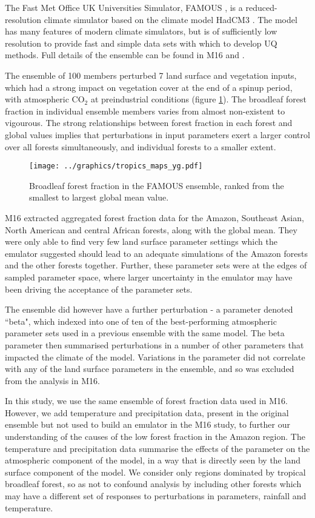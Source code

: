 \documentclass[gmd, manuscript]{copernicus}
\begin{document}
The Fast Met Office UK Universities Simulator, FAMOUS \citep{jones2005systematic, smith2008famous}, is a reduced-resolution climate simulator based on the climate model HadCM3 \citep{gordon2000simulation, pope2000impact}. The model has many features of modern climate simulators, but is of sufficiently low resolution to provide fast and simple data sets with which to develop UQ methods. Full details of the ensemble can be found in M16 and \cite{williams2013optimising}.

The ensemble of 100 members perturbed 7 land surface and vegetation inputs, which had a strong impact on vegetation cover at the end of a spinup period, with atmospheric CO$_2$ at preindustrial conditions (figure \ref{fig:tropics_maps_yg}). The broadleaf forest fraction in individual ensemble members varies from almost non-existent to vigourous. The strong relationships between forest fraction in each forest and global values implies that perturbations in input parameters exert a larger control over all forests simultaneously, and individual forests to a smaller extent.

\begin{figure}[t]
\texttt{[image: ../graphics/tropics\_maps\_yg.pdf]}
\caption{Broadleaf forest fraction in the FAMOUS ensemble, ranked from the smallest to largest global mean value.}
\label{fig:tropics_maps_yg}
\end{figure}


M16 extracted aggregated forest fraction data for the Amazon, Southeast Asian, North American and central African forests, along with the global mean. They were only able to find very few land surface parameter settings which the emulator suggested should lead to an adequate simulations of the Amazon forests and the other forests together. Further, these parameter sets were at the edges of sampled parameter space, where larger uncertainty in the emulator may have been driving the acceptance of the parameter sets. 

The ensemble did however have a further perturbation - a parameter denoted ``beta", which indexed into one of ten of the best-performing atmospheric parameter sets used in a previous ensemble with the same model. The beta parameter then summarised perturbations in a number of other parameters that impacted the climate of the model. Variations in the  parameter did not correlate with any of the land surface parameters in the ensemble, and so  was excluded from the analysis in M16.
 
In this study, we use the same ensemble of forest fraction data used in M16. However, we add temperature and precipitation data, present in the original ensemble but not used to build an emulator in the M16 study, to further our understanding of the causes of the low forest fraction in the Amazon region. The temperature and precipitation data summarise the effects of the parameter on the atmospheric component of the model, in a way that is directly seen by the land surface component of the model. We consider only regions dominated by tropical broadleaf forest, so as not to confound analysis by including other forests which may have a different set of responses to perturbations in parameters, rainfall and temperature.
\end{document}
